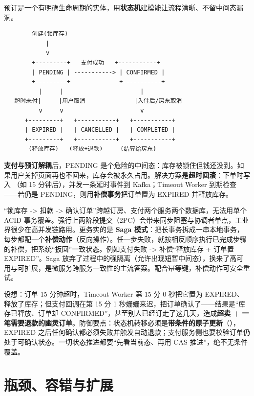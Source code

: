 预订是一个有明确生命周期的实体，用\textbf{状态机}建模能让流程清晰、不留中间态漏洞。

\begin{lstlisting}
        创建(锁库存)
            |
            v
        +---------+   支付成功   +-----------+
        | PENDING | -----------> | CONFIRMED |
        +---------+              +-----------+
          |     |                      |
   超时未付|     |用户取消              |入住后/房东取消
          v     v                      v
      +---------+   +-----------+   +-----------+
      | EXPIRED |   | CANCELLED |   | COMPLETED |
      +---------+   +-----------+   +-----------+
       (释放库存)   (释放+退款)     (结算给房东)
\end{lstlisting}

\textbf{支付与预订解耦}后，PENDING 是个危险的中间态：库存被锁住但钱还没到。如果用户关掉页面再也不回来，库存会被永久占用。解决方案是\textbf{超时回滚}：下单时写入 （如 15 分钟后），并发一条延时事件到 Kafka；Timeout Worker 到期检查——若仍是 PENDING，则用\textbf{补偿事务}把订单置为 EXPIRED 并释放库存。

\begin{idea}
“锁库存 -> 扣款 -> 确认订单”跨越订房、支付两个服务两个数据库，无法用单个 ACID 事务覆盖。强行上两阶段提交（2PC）会带来同步阻塞与协调者单点，工业界很少在高并发链路用。更务实的是 \textbf{Saga 模式}：把长事务拆成一串本地事务，每步都配一个\textbf{补偿动作}（反向操作）。任一步失败，就按相反顺序执行已完成步骤的补偿，把系统“扳回”一致状态。例如支付失败 -> 补偿“释放库存 + 订单置 EXPIRED”。Saga 放弃了过程中的强隔离（允许出现短暂中间态），换来了高可用与可扩展，是微服务跨服务一致性的主流答案。配合幂等键，补偿动作可安全重试。
\end{idea}

\begin{pitfall}[超时释放与延迟到账的竞态]
设想：订单 15 分钟超时，Timeout Worker 第 15 分 0 秒把它置为 EXPIRED、释放了库存；但支付回调在第 15 分 1 秒姗姗来迟，把订单确认了——结果是“库存已释放、订单却 CONFIRMED”，甚至别人已经订走了这几天，造成\textbf{超卖 + 一笔需要退款的幽灵订单}。防御要点：状态机转移必须是\textbf{带条件的原子更新}（），EXPIRED 之后任何确认都必须失败并触发自动退款；支付服务侧也要校验订单仍处于可确认状态。一切状态推进都要“先看当前态、再用 CAS 推进”，绝不无条件覆盖。
\end{pitfall}

\section{瓶颈、容错与扩展}


